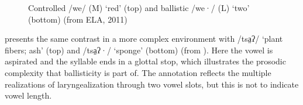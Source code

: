 \documentclass[output=paper]{langscibook}
\begin{document}
  
\begin{figure}
\caption{Controlled /we/ (M) ‘red’ (top) and ballistic /we·/ (L) ‘two’ (bottom) (from ELA, 2011)}
\label{fig:dobui:1}
\end{figure}

 presents the same contrast in a more complex environment with /tsa̤ʔ/ ‘plant fibers; ash’ (top) and /tsa̤ʔ·/ ‘sponge’ (bottom) (from \citealt{JP2021}). Here the vowel is aspirated and the syllable ends in a glottal stop, which illustrates the prosodic complexity that ballisticity is part of. The annotation reflects the multiple realizations of laryngealization through two vowel slots, but this is not to indicate vowel length.
\end{document}

